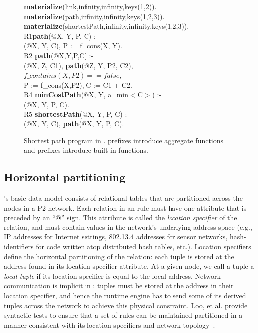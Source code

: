\begin{figure}
\ssp
\begin{boxedminipage}{\linewidth}
{\bf materialize}(link,infinity,infinity,keys(1,2)). \\
{\bf materialize}(path,infinity,infinity,keys(1,2,3)).  \\
{\bf materialize}(shortestPath,infinity,infinity,keys(1,2,3)). \\

R1{\bf path}(@X, Y, P, C) :- \\
(@X, Y, C), P := f\_cons(X, Y). \\

R2 {\bf path}(@X,Y,P,C) :- \\
(@X, Z, C1), {\bf path}(@Z, Y, P2, C2), \\
\datalogspace $f\_contains(X,P2) == false$, \\
\datalogspace P := f\_cons(X,P2), C := C1 + C2. \\ 

R4 {\bf minCostPath}(@X, Y, a\_min$<$C$>$) :-  \\
(@X, Y, P, C). \\

R5 {\bf shortestPath}(@X, Y, P, C) :- \\
(@X, Y, C), {\bf path}(@X, Y, P, C).\\
\end{boxedminipage}
\caption{\label{ch:p2:fig:overlogSP}Shortest path program in \OVERLOG. 
prefixes introduce aggregate functions and  prefixes introduce
built-in functions.}
\end{figure}

\subsection{Horizontal partitioning}

\OVERLOG's basic data model consists of relational tables that are partitioned
across the nodes in a P2 network.  Each relation in an \OVERLOG rule must have
one attribute that is preceded by an ``@'' sign.  This attribute is called the
{\em location specifier} of the relation, and must contain values in the
network's underlying address space (e.g., IP addresses for Internet settings,
802.13.4 addresses for sensor networks, hash-identifiers for code written atop
distributed hash tables, etc.).  Location specifiers define the horizontal
partitioning of the relation: each tuple is stored at the address found in its
location specifier attribute.  At a given node, we call a tuple a {\em local
tuple} if its location specifier is equal to the local address.  Network
communication is implicit in \OVERLOG: tuples must be stored at the address in
their location specifier, and hence the runtime engine has to send some of its
derived tuples across the network to achieve this physical constraint.  Loo, et
al.  provide syntactic tests to ensure that a set of rules can be maintained
partitioned in a manner consistent with its location specifiers and network
topology~\cite{loo-sigmod06}.


